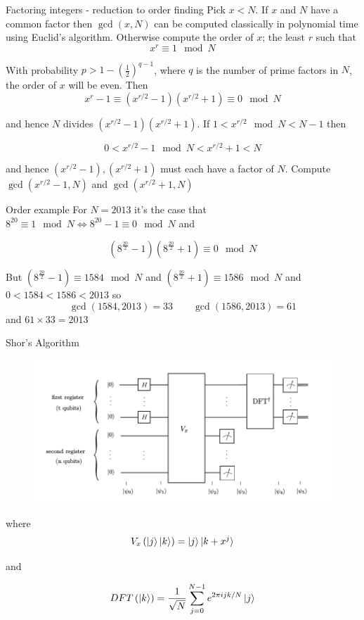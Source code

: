 \documentclass{beamer}
\begin{document}
\begin{frame}{Factoring integers - reduction to order finding}
Pick $x<N$. If $x$ and $N$ have a common factor then $\gcd(x,N)$ can be computed classically in polynomial time using Euclid's algorithm. Otherwise compute the order of $x$; the least $r$ such that
\[
x^r\equiv 1 \mod N
\]

With probability $p>1-\left(\frac{1}{2}\right)^{q-1}$, where $q$ is the number of prime factors in $N$, the order of $x$ will be even. Then
\[
x^r-1\equiv \left(x^{r/2}-1\right)\left(x^{r/2}+1\right)\equiv 0 \mod N
\]

and hence $N$ divides $\left(x^{r/2}-1\right)\left(x^{r/2}+1\right)$. If $1<x^{r/2}\mod N<N-1$ then 

\[
0<x^{r/2}-1\mod N<x^{r/2}+1<N
\]

and hence $\left(x^{r/2}-1\right),\left(x^{r/2}+1\right)$ must each have a factor of $N$. Compute $\gcd(x^{r/2}-1,N)$ and $\gcd(x^{r/2}+1,N)$ 

\end{frame}

\begin{frame}{Order example}
For $N=2013$ it's the case that $8^{20}\equiv 1 \mod N \iff 8^{20}- 1 \equiv 0 \mod N$ and 

\[
\left(8^{\frac{20}{2}}-1\right)\left(8^{\frac{20}{2}}+1\right)\equiv 0 \mod N
\]

But $\left(8^{\frac{20}{2}}-1\right)\equiv 1584 \mod N$ and  $\left(8^{\frac{20}{2}}+1\right)\equiv 1586 \mod N$ and $0<1584<1586<2013$ so 
\[
\gcd \left(1584,2013\right)=33 \qquad \gcd \left(1586,2013\right)=61
\]
 and $61\times 33=2013$

\end{frame}

\begin{frame}{Shor's Algorithm}

\begin{figure}[ht]
  \includegraphics[scale=0.4]{pasted5}
\end{figure}

where 
\[
V_x \left(\ket{j}\ket{k}\right) = \ket{j}\ket{k+x^j}
\]

and

\[
DFT\left(\ket{k}\right) = \frac{1}{\sqrt{N}}\sum_{j=0}^{N-1}e^{2\pi i j k/N}\ket{j}
\]
\end{frame}
\end{document}
